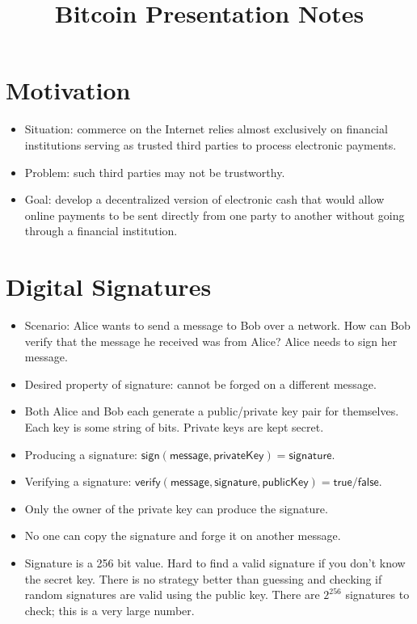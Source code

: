 \documentclass{article}
\title{Bitcoin Presentation Notes}
\author{}
\date{}
\begin{document}
\maketitle

\section{Motivation}

\begin{itemize}
  \item Situation: commerce on the Internet relies almost exclusively on
    financial institutions serving as trusted third parties to process
    electronic payments.
  \item Problem: such third parties may not be trustworthy.
  \item Goal: develop a decentralized version of electronic cash that would
    allow online payments to be sent directly from one party to another without
    going through a financial institution.
\end{itemize}

\section{Digital Signatures}

\begin{itemize}
  \item Scenario: Alice wants to send a message to Bob over a network. How can
    Bob verify that the message he received was from Alice? Alice needs to sign
    her message.
  \item Desired property of signature: cannot be forged on a different message.
  \item Both Alice and Bob each generate a public/private key pair for
    themselves. Each key is some string of bits. Private keys are kept secret.
  \item Producing a signature: $\mathsf{sign(message, privateKey)} =
    \mathsf{signature}$.
  \item Verifying a signature: $\mathsf{verify(message, signature, publicKey) =
    true / false}$.
  \item Only the owner of the private key can produce the signature.
  \item No one can copy the signature and forge it on another message.
  \item Signature is a 256 bit value. Hard to find a valid signature if you
    don't know the secret key. There is no strategy better than guessing and
    checking if random signatures are valid using the public key. There are
    $2^{256}$ signatures to check; this is a very large number.
\end{itemize}
\end{document}
